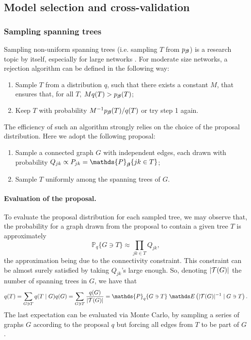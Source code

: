 \tocless\subsection{Model selection and cross-validation} \label{sec:modSel}

\subsubsection{Sampling spanning trees} \label{eq:sampTree}
Sampling non-uniform spanning trees (i.e. sampling $T$ from $p_{\boldsymbol{\beta}}$) is a research topic by itself, especially for large networks \citep[see][for a review]{DKP17}. For moderate size networks, a rejection algorithm \citep{Dev86} can be defined in the following way:
\begin{enumerate}
\item Sample $T$ from a distribution $q$, such that there exists a constant $M$, that ensures that, for all $T$, $M q(T) > p_{\boldsymbol{\beta}}(T)$;
\item Keep $T$ with probability $M^{-1} p_{\boldsymbol{\beta}}(T) / q(T)$ or try step 1 again.
\end{enumerate}
The efficiency of such an algorithm strongly relies on the choice of the proposal distribution. Here we adopt the following proposal:
\begin{enumerate}[label=\roman*]
\item Sample a connected graph $G$ with independent edges, each drawn with probability $Q_{jk} \propto P_{jk} = \mathds{P}_\betabf\{ jk \in T\}$; 
\item Sample $T$ uniformly among the spanning trees of $G$.
\end{enumerate}
%
\paragraph{Evaluation of the proposal.}
To evaluate the proposal distribution for each sampled tree, we may observe that, the probability for a graph drawn from the proposal to contain a given tree $T$ is approximately
$$
\mathds{P}_q\{G \ni T\} \approx \prod_{jk \in T} Q_{jk},
$$
the approximation being due to the connectivity constraint. This constraint can be almost surely satisfied by taking $Q_{jk}$'s large enough. So, denoting $|{\mathcal{T}}(G)|$ the number of spanning trees in $G$, we have that
\begin{align*}
q(T) 
= \sum_{G \ni T} q(T \mid G) q(G)  = \sum_{G \ni T} \frac{q(G)}{|\Tcal(G)|} 
= \mathds{P}_q\{G \ni T\} \; \Esp\left(|\Tcal(G)|^{-1} \mid G \ni T \right).
\end{align*}
The last expectation can be evaluated via Monte Carlo, by sampling a series of graphs $G$ according to the proposal $q$ but forcing all edges from $T$ to be part of $G$. 
%

